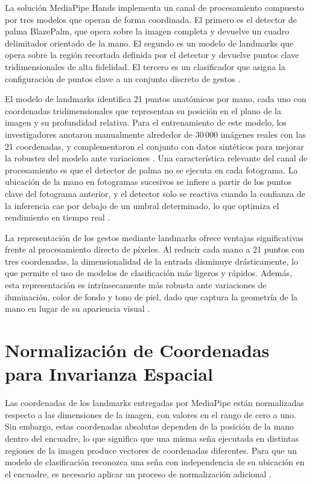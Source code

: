 La solución MediaPipe Hands implementa un canal de procesamiento compuesto por tres
modelos que operan de forma coordinada. El primero es el detector de palma BlazePalm, que
opera sobre la imagen completa y devuelve un cuadro delimitador orientado de la mano. El
segundo es un modelo de landmarks que opera sobre la región recortada definida por el
detector y devuelve puntos clave tridimensionales de alta fidelidad. El tercero es un
clasificador que asigna la configuración de puntos clave a un conjunto discreto de
gestos \cite{bazarevsky_blazepalm_2019}.

El modelo de landmarks identifica 21 puntos anatómicos por mano, cada uno con
coordenadas tridimensionales que representan su posición en el plano de la imagen y su
profundidad relativa. Para el entrenamiento de este modelo, los investigadores anotaron
manualmente alrededor de 30\,000 imágenes reales con las 21 coordenadas, y
complementaron el conjunto con datos sintéticos para mejorar la robustez del modelo ante
variaciones \cite{bazarevsky_blazepalm_2019}. Una característica relevante del canal de procesamiento es que el
detector de palma no se ejecuta en cada fotograma. La ubicación de la mano en fotogramas
sucesivos se infiere a partir de los puntos clave del fotograma anterior, y el detector solo
se reactiva cuando la confianza de la inferencia cae por debajo de un umbral determinado,
lo que optimiza el rendimiento en tiempo real \cite{bazarevsky_blazepalm_2019}.

La representación de los gestos mediante landmarks ofrece ventajas significativas frente al
procesamiento directo de píxeles. Al reducir cada mano a 21 puntos con tres coordenadas,
la dimensionalidad de la entrada disminuye drásticamente, lo que permite el uso de modelos
de clasificación más ligeros y rápidos. Además, esta representación es intrínsecamente más
robusta ante variaciones de iluminación, color de fondo y tono de piel, dado que captura la
geometría de la mano en lugar de su apariencia visual \cite{zhang_mediapipe_2020}.

\section{Normalización de Coordenadas para Invarianza Espacial}

Las coordenadas de los landmarks entregadas por MediaPipe están normalizadas respecto a
las dimensiones de la imagen, con valores en el rango de cero a uno. Sin embargo, estas
coordenadas absolutas dependen de la posición de la mano dentro del encuadre, lo que
significa que una misma seña ejecutada en distintas regiones de la imagen produce vectores
de coordenadas diferentes. Para que un modelo de clasificación reconozca una seña con
independencia de su ubicación en el encuadre, es necesario aplicar un proceso de
normalización adicional \cite{szeliski_cv_2022}.

